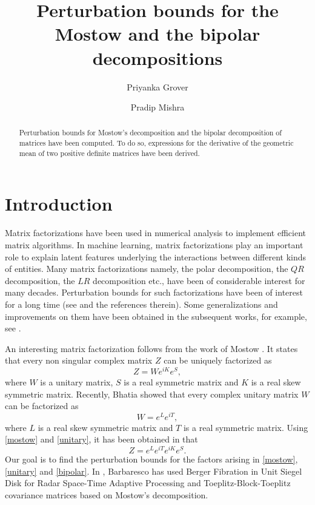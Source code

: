\documentclass[12pt,epsfig,reqno]{amsart}
\author[Grover]{Priyanka Grover}
\author[Mishra]{Pradip Mishra}
\title{Perturbation bounds for the Mostow and the bipolar decompositions}
\theoremstyle{remark}
\begin{document}
\maketitle
\begin{abstract}
 Perturbation bounds for Mostow's decomposition and the bipolar decomposition of matrices have been computed. To do so, expressions for the derivative of the geometric mean of two positive definite matrices have been derived.
\end{abstract}


\section{Introduction}
Matrix factorizations have been used in numerical analysis to implement efficient matrix algorithms. In machine learning, matrix factorizations play an important role to explain latent features underlying the interactions between different kinds of entities. Many matrix factorizations namely, the polar decomposition, the $QR$ decomposition, the $LR$ decomposition etc., have been of considerable interest for many decades. Perturbation bounds for such factorizations have been of interest for a long time (see \cite{bhatia_Matrix_factorizations, stewart, sun_stewart} and the references therein). Some generalizations and improvements on them have been obtained in the subsequent works, for example, see \cite{chang,chang_stehle,galantai,largillier,li_sun,li_sun2,li_yang_shao,xie}.


An interesting matrix factorization follows from the work of Mostow \cite{mostow}. It states  that every non singular complex matrix $Z$ can be uniquely factorized as
\begin{equation}
Z=We^{iK} e^S, \label{mostow}
\end{equation}
where $W$ is a unitary matrix, $S$ is a real symmetric matrix and $K$ is a real skew symmetric matrix. Recently, Bhatia \cite{bhatia_bipolar} showed that every complex unitary matrix $W$  can be factorized as
\begin{equation}
W=e^L e^{iT} \label{unitary},
\end{equation}where $L$ is a real skew symmetric matrix and $T$ is a real symmetric matrix.
Using \eqref{mostow} and \eqref{unitary}, it has been obtained in \cite{bhatia_bipolar} that
\begin{equation}
Z=e^L e^{iT} e^{iK} e^S. \label{bipolar}
\end{equation}
Our goal is to find the perturbation bounds for the factors arising in \eqref{mostow}, \eqref{unitary} and \eqref{bipolar}.  In \cite{barbaresco}, Barbaresco has used Berger Fibration in Unit Siegel Disk for Radar Space-Time Adaptive Processing and Toeplitz-Block-Toeplitz covariance matrices based on  Mostow's decomposition.
\end{document}
